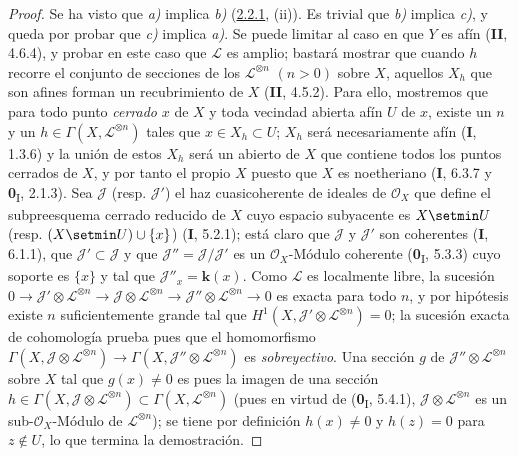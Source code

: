 \begin{proof}
Se ha visto que \emph{a)} implica \emph{b)} (\hyperref[III.2.2.1-fr]{2.2.1}, (ii)). Es
trivial que \emph{b)} implica \emph{c)}, y queda por probar que \emph{c)} implica
\emph{a)}. Se puede limitar al caso en que $Y$ es afín (\textbf{II}, 4.6.4), y probar
en este caso que $\mathcal L$ es amplio; bastará mostrar que cuando
$h$ recorre el conjunto de secciones de los $\mathcal L^{\otimes n}$
$(n>0)$ sobre $X$, aquellos $X_h$ que son afines forman un
recubrimiento de $X$ (\textbf{II}, 4.5.2). Para ello, mostremos que para todo punto
\emph{cerrado} $x$ de $X$ y toda vecindad abierta afín $U$ de $x$, existe un
$n$ y un $h\in\Gamma(X,\mathcal L^{\otimes n})$ tales que
$x\in X_h\subset U$; $X_h$ será necesariamente afín (\textbf{I}, 1.3.6) y la
unión de estos $X_h$ será un abierto de $X$ que contiene todos los puntos
cerrados de $X$, y por tanto el propio $X$ puesto que $X$ es noetheriano
(\textbf{I}, 6.3.7 y \textbf{0}\textsubscript{I}, 2.1.3). Sea $\mathcal J$ (resp.
$\mathcal J'$) el haz cuasicoherente de ideales de $\mathcal O_X$
que define el subpreesquema cerrado reducido de $X$ cuyo espacio
subyacente es $X\setmin U$ (resp. $(X\setmin U)\cup\{x\}$) (\textbf{I}, 5.2.1); está claro que
$\mathcal J$ y $\mathcal J'$ son coherentes (\textbf{I}, 6.1.1), que
$\mathcal J'\subset\mathcal J$ y que
$\mathcal J''=\mathcal J/\mathcal J'$ es un $\mathcal O_X$-Módulo
coherente (\textbf{0}\textsubscript{I}, 5.3.3) cuyo soporte es $\{x\}$ y tal
que $\mathcal J''_x=\boldsymbol{k}(x)$. Como $\mathcal L$ es localmente libre, la
sucesión
$0\to\mathcal J'\otimes\mathcal L^{\otimes n}
\to\mathcal J\otimes\mathcal L^{\otimes n}
\to\mathcal J''\otimes\mathcal L^{\otimes n}\to0$
es exacta para todo $n$, y por hipótesis existe $n$ suficientemente grande tal
que $H^1(X,\mathcal J'\otimes\mathcal L^{\otimes n})=0$; la sucesión
exacta de cohomología
prueba pues que el homomorfismo
$\Gamma(X,\mathcal J\otimes\mathcal L^{\otimes n})
\to
\Gamma(X,\mathcal J''\otimes\mathcal L^{\otimes n})$
es \emph{sobreyectivo}. Una sección $g$ de
$\mathcal J''\otimes\mathcal L^{\otimes n}$ sobre $X$ tal que
$g(x)\neq0$ es pues la imagen de una sección
$h\in\Gamma(X,\mathcal J\otimes\mathcal L^{\otimes n})
\subset\Gamma(X,\mathcal L^{\otimes n})$ (pues en virtud de
(\textbf{0}\textsubscript{I}, 5.4.1),
$\mathcal J\otimes\mathcal L^{\otimes n}$ es un sub-$\mathcal O_X$-Módulo
de $\mathcal L^{\otimes n}$); se tiene por definición $h(x)\neq0$ y
$h(z)=0$ para $z\notin U$, lo que termina la demostración.
\end{proof}

